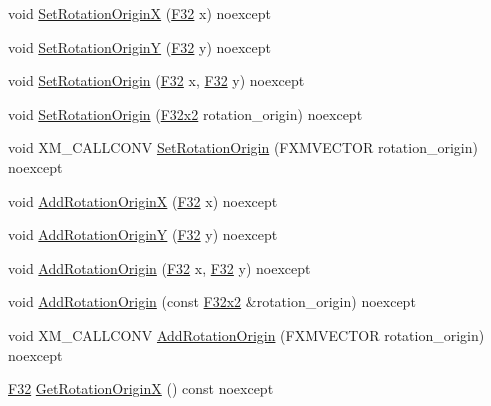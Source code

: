 \begin{DoxyCompactItemize}
\item 
void \hyperlink{classmage_1_1_sprite_transform_a1928602ce38aa2ebf26becd93c875dc5}{Set\+Rotation\+OriginX} (\hyperlink{namespacemage_aa97e833b45f06d60a0a9c4fc22ae02c0}{F32} x) noexcept
\item 
void \hyperlink{classmage_1_1_sprite_transform_a8ccfaf7282419ed636cc97f911472604}{Set\+Rotation\+OriginY} (\hyperlink{namespacemage_aa97e833b45f06d60a0a9c4fc22ae02c0}{F32} y) noexcept
\item 
void \hyperlink{classmage_1_1_sprite_transform_adc5bb1cd5512bea503c981624088a5be}{Set\+Rotation\+Origin} (\hyperlink{namespacemage_aa97e833b45f06d60a0a9c4fc22ae02c0}{F32} x, \hyperlink{namespacemage_aa97e833b45f06d60a0a9c4fc22ae02c0}{F32} y) noexcept
\item 
void \hyperlink{classmage_1_1_sprite_transform_a2494e4350b47a6ef3e1f7642a8f7d8c6}{Set\+Rotation\+Origin} (\hyperlink{namespacemage_aa87237ad091f5cd7da612b8523fc108f}{F32x2} rotation\+\_\+origin) noexcept
\item 
void X\+M\+\_\+\+C\+A\+L\+L\+C\+O\+NV \hyperlink{classmage_1_1_sprite_transform_acbb3eebc3fd26d616f5e4ca75a8c112b}{Set\+Rotation\+Origin} (F\+X\+M\+V\+E\+C\+T\+OR rotation\+\_\+origin) noexcept
\item 
void \hyperlink{classmage_1_1_sprite_transform_a784e2f78ba65645ad2c40b4d249c744a}{Add\+Rotation\+OriginX} (\hyperlink{namespacemage_aa97e833b45f06d60a0a9c4fc22ae02c0}{F32} x) noexcept
\item 
void \hyperlink{classmage_1_1_sprite_transform_aa6fa39d59d2bd73d1b51ffbe185175a7}{Add\+Rotation\+OriginY} (\hyperlink{namespacemage_aa97e833b45f06d60a0a9c4fc22ae02c0}{F32} y) noexcept
\item 
void \hyperlink{classmage_1_1_sprite_transform_adc0912e49d43143f7fe5c8fc1c25dacf}{Add\+Rotation\+Origin} (\hyperlink{namespacemage_aa97e833b45f06d60a0a9c4fc22ae02c0}{F32} x, \hyperlink{namespacemage_aa97e833b45f06d60a0a9c4fc22ae02c0}{F32} y) noexcept
\item 
void \hyperlink{classmage_1_1_sprite_transform_a59d9f7b6e6a31110d4657fbc00961182}{Add\+Rotation\+Origin} (const \hyperlink{namespacemage_aa87237ad091f5cd7da612b8523fc108f}{F32x2} \&rotation\+\_\+origin) noexcept
\item 
void X\+M\+\_\+\+C\+A\+L\+L\+C\+O\+NV \hyperlink{classmage_1_1_sprite_transform_a8f1ce16eb9c07a4f798e93bf58eb2b46}{Add\+Rotation\+Origin} (F\+X\+M\+V\+E\+C\+T\+OR rotation\+\_\+origin) noexcept
\item 
\hyperlink{namespacemage_aa97e833b45f06d60a0a9c4fc22ae02c0}{F32} \hyperlink{classmage_1_1_sprite_transform_a980beb77dc4b64a2d784361d61981f9c}{Get\+Rotation\+OriginX} () const noexcept

\end{DoxyCompactItemize}
